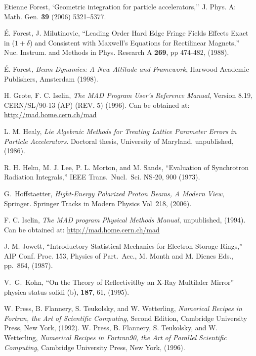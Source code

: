 \begin{thebibliography}{XXXXXXX99}
Etienne Forest, `Geometric integration for particle accelerators,''
J. Phys. A: Math. Gen. {\bf 39} (2006) 5321–5377.

\'E. Forest, J. Milutinovic, 
``Leading Order Hard Edge Fringe Fields Effects Exact in ($1+\delta$) and 
Consistent with Maxwell's Equations for Rectilinear Magnets,''
Nuc. Instrum. and Methods in Phys. Research A {\bf 269}, pp 474-482, (1988).

\'E. Forest, {\em Beam Dynamics: A New Attitude and Framework},
Harwood Academic Publishers, Amsterdam (1998).


H. Grote, F. C. Iselin, {\it The MAD Program User's Reference Manual},
Version 8.19, CERN/SL/90-13 (AP) (REV. 5) (1996). 
Can be obtained at:
\hfill\break
\hspace*{0.3in}
\url{http://mad.home.cern.ch/mad} 

L. M. Healy, {\it Lie Algebraic Methods for Treating Lattice Parameter
Errors in Particle Accelerators}. Doctoral thesis, University of
Maryland, unpublished, (1986).

R. H. Helm, M. J. Lee, P. L. Morton, and M. Sands, ``Evaluation of Synchrotron
Radiation Integrals,'' IEEE Trans.~Nucl.~Sci. NS-20, 900 (1973).

G.~Hoffstaetter, {\it Hight-Energy Polarized Proton Beams, A Modern View}, 
Springer. Springer Tracks in Modern Physics Vol~218, (2006).

F. C. Iselin, {\it The MAD program Physical Methods Manual}, 
unpublished, (1994).  Can be obtained at: 
\hfill\break
\hspace*{0.3in}
\url{http://mad.home.cern.ch/mad}

J. M. Jowett, ``Introductory Statistical Mechanics
for Electron Storage Rings,'' AIP Conf. Proc. 153, Physics of Part.\ Acc.,
M. Month and M. Dienes Eds., pp.~864, (1987).

V.~G.~Kohn, 
``On the Thcory of Reflectivitlby an X-Ray Multilaler Mirror''
physica status solidi (b), {\bf 187}, 61, (1995).

W. Press, B. Flannery, S. Teukolsky, and W. Wetterling, {\em Numerical
Recipes in Fortran, the Art of Scientific Computing}, Second Edition,
Cambridge University Press, New York, (1992). \hfill \break
W. Press, B. Flannery, S. Teukolsky, and W. Wetterling, {\em Numerical
Recipes in Fortran90, the Art of Parallel Scientific Computing}, 
Cambridge University Press, New York, (1996).


\end{thebibliography}
